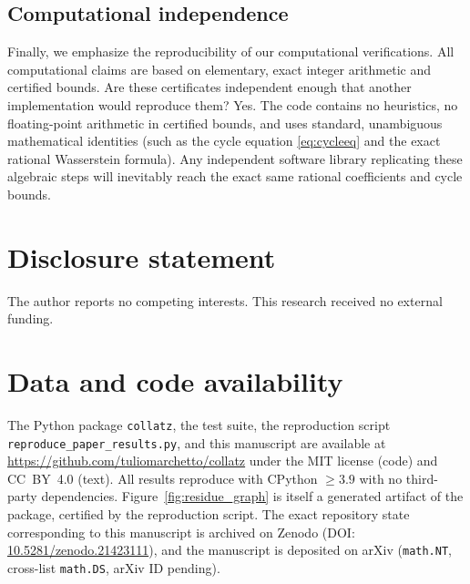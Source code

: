 \documentclass[11pt]{amsart}
\theoremstyle{definition}
\theoremstyle{remark}
\begin{document}
\subsection*{Computational independence}
Finally, we emphasize the reproducibility of our computational verifications. All computational claims are based on elementary, exact integer arithmetic and certified bounds. Are these certificates independent enough that another implementation would reproduce them? Yes. The code contains no heuristics, no floating-point arithmetic in certified bounds, and uses standard, unambiguous mathematical identities (such as the cycle equation \eqref{eq:cycleeq} and the exact rational Wasserstein formula). Any independent software library replicating these algebraic steps will inevitably reach the exact same rational coefficients and cycle bounds.

\section*{Disclosure statement}
The author reports no competing interests. This research received no external funding.

\section*{Data and code availability}
The Python package \texttt{collatz}, the test suite, the reproduction script \texttt{reproduce\_paper\_results.py}, and this manuscript are available at \url{https://github.com/tuliomarchetto/collatz} under the MIT license (code) and CC~BY~4.0 (text). All results reproduce with CPython $\ge 3.9$ with no third-party dependencies. Figure~\ref{fig:residue_graph} is itself a generated artifact of the package, certified by the reproduction script. The exact repository state corresponding to this manuscript is archived on Zenodo (DOI: \href{https://doi.org/10.5281/zenodo.21423111}{10.5281/zenodo.21423111}), and the manuscript is deposited on arXiv (\texttt{math.NT}, cross-list \texttt{math.DS}, arXiv ID pending).



\end{document}
